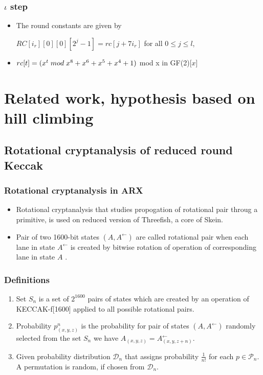\documentclass{beamer}
\begin{document}
\begin{frame}
\frametitle{$\iota$ step}
\begin{itemize}
\item The round constants are given by
\begin{center}$RC[i_{r}][0][0][2^{j} - 1] = rc[j + 7i_{r}]$ for all $ 0 \leq j \leq l$,\end{center}
\item $rc[t] = (x^{t} \thickspace mod \thickspace x^{8} + x^{6} + x^{5} + x^{4} + 1)$ mod x in GF(2)[$x$]
\end{itemize}
\end{frame}

\section{Related work, hypothesis based on hill climbing}

\subsection{Rotational cryptanalysis of reduced round Keccak}

\begin{frame}
\frametitle{Rotational cryptanalysis in ARX}
\begin{itemize}
\item Rotational cryptanalysis that studies propogation of rotational pair throug a primitive, is used on 
reduced version of Threefish, a core of Skein\footnotemark.
\item Pair of two 1600-bit states $(A, A^{\leftarrow})$ are called rotational pair when each lane in 
state $A^{\leftarrow}$ is created by bitwise rotation of operation of corresponding lane in state $A$
\footnotemark.
\end{itemize}
\end{frame}

\begin{frame}
\frametitle{Definitions}
\begin{enumerate}
\item Set $S_n$ is a set of $2^{1600}$ pairs of states which are created by an operation of KECCAK-f[1600] 
applied to all possible rotational pairs.
\item Probability $p^{n}_{(x, y, z)}$ is the probability for pair of states $(A, A^{\leftarrow})$ randomly 
selected from the set $S_n$ we have $A_{(x, y, z)} = A^{\leftarrow}_{(x, y, z + n)}$.
\item Given probability distribution $\mathcal{D}_n$ that assigns probability $\frac{1}{n!}$ for each 
$p \in \mathcal{P}_n$. A permutation is random, if chosen from $\mathcal{D}_n$.
\end{enumerate}
\end{frame}
\end{document}

